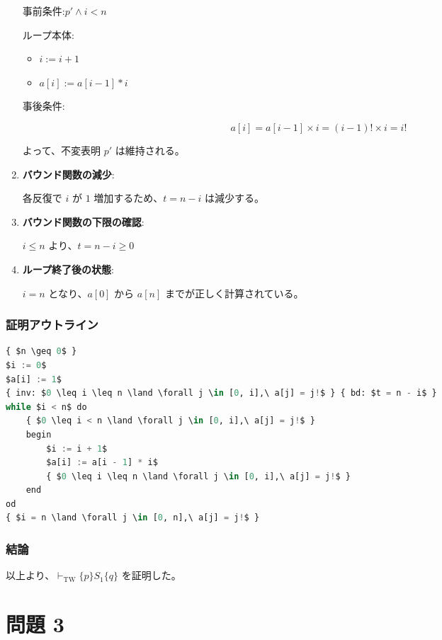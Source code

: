 \documentclass[12pt,a4paper]{article}
\begin{document}
\begin{CJK}{UTF8}{ipxm}
\begin{enumerate}
    事前条件:$p' \land i < n$

    ループ本体:

    \begin{itemize}
        \item $i := i + 1$
        \item $a[i] := a[i - 1] * i$
    \end{itemize}

    事後条件:

    \[
    a[i] = a[i - 1] \times i = (i - 1)! \times i = i!
    \]

    よって、不変表明 $p'$ は維持される。

    \item \textbf{バウンド関数の減少}:

    各反復で $i$ が $1$ 増加するため、$t = n - i$ は減少する。

    \item \textbf{バウンド関数の下限の確認}:

    $i \leq n$ より、$t = n - i \geq 0$

    \item \textbf{ループ終了後の状態}:

    $i = n$ となり、$a[0]$ から $a[n]$ までが正しく計算されている。

\end{enumerate}

\subsubsection*{証明アウトライン}

\begin{lstlisting}[language=Python, mathescape=true]
{ $n \geq 0$ }
$i := 0$
$a[i] := 1$
{ inv: $0 \leq i \leq n \land \forall j \in [0, i],\ a[j] = j!$ } { bd: $t = n - i$ }
while $i < n$ do
    { $0 \leq i < n \land \forall j \in [0, i],\ a[j] = j!$ }
    begin
        $i := i + 1$
        $a[i] := a[i - 1] * i$
        { $0 \leq i \leq n \land \forall j \in [0, i],\ a[j] = j!$ }
    end
od
{ $i = n \land \forall j \in [0, n],\ a[j] = j!$ }
\end{lstlisting}

\subsubsection*{結論}

以上より、$\vdash_{\text{TW}} \{ p \} S_1 \{ q \}$ を証明した。

\section*{問題 3}


\end{CJK}
\end{document}
